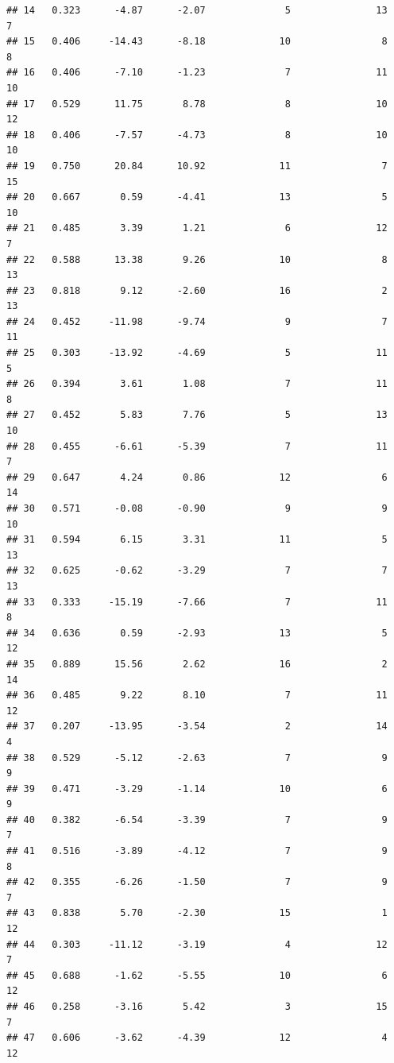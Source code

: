 \documentclass[]{book}
\begin{document}
\begin{verbatim}
## 14   0.323      -4.87      -2.07              5               13        7
## 15   0.406     -14.43      -8.18             10                8        8
## 16   0.406      -7.10      -1.23              7               11       10
## 17   0.529      11.75       8.78              8               10       12
## 18   0.406      -7.57      -4.73              8               10       10
## 19   0.750      20.84      10.92             11                7       15
## 20   0.667       0.59      -4.41             13                5       10
## 21   0.485       3.39       1.21              6               12        7
## 22   0.588      13.38       9.26             10                8       13
## 23   0.818       9.12      -2.60             16                2       13
## 24   0.452     -11.98      -9.74              9                7       11
## 25   0.303     -13.92      -4.69              5               11        5
## 26   0.394       3.61       1.08              7               11        8
## 27   0.452       5.83       7.76              5               13       10
## 28   0.455      -6.61      -5.39              7               11        7
## 29   0.647       4.24       0.86             12                6       14
## 30   0.571      -0.08      -0.90              9                9       10
## 31   0.594       6.15       3.31             11                5       13
## 32   0.625      -0.62      -3.29              7                7       13
## 33   0.333     -15.19      -7.66              7               11        8
## 34   0.636       0.59      -2.93             13                5       12
## 35   0.889      15.56       2.62             16                2       14
## 36   0.485       9.22       8.10              7               11       12
## 37   0.207     -13.95      -3.54              2               14        4
## 38   0.529      -5.12      -2.63              7                9        9
## 39   0.471      -3.29      -1.14             10                6        9
## 40   0.382      -6.54      -3.39              7                9        7
## 41   0.516      -3.89      -4.12              7                9        8
## 42   0.355      -6.26      -1.50              7                9        7
## 43   0.838       5.70      -2.30             15                1       12
## 44   0.303     -11.12      -3.19              4               12        7
## 45   0.688      -1.62      -5.55             10                6       12
## 46   0.258      -3.16       5.42              3               15        7
## 47   0.606      -3.62      -4.39             12                4       12

\end{verbatim}
\end{document}
